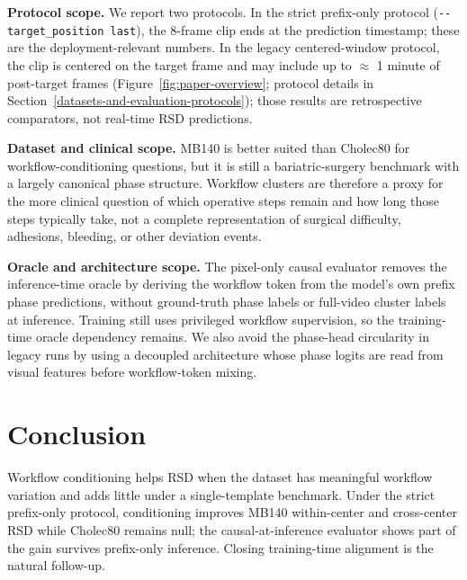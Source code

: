 \textbf{Protocol scope.} We report two protocols. In the strict
prefix-only protocol (\texttt{-\/-target\_position\ last}), the 8-frame
clip ends at the prediction timestamp; these are the deployment-relevant
numbers. In the legacy centered-window protocol, the clip is centered on
the target frame and may include up to $\approx$ 1 minute of post-target
frames (Figure~\ref{fig:paper-overview}; protocol details in
Section~\ref{datasets-and-evaluation-protocols}); those results are
retrospective comparators, not real-time RSD predictions.

\textbf{Dataset and clinical scope.} MB140 is better suited than
Cholec80 for workflow-conditioning questions, but it is still a
bariatric-surgery benchmark with a largely canonical phase structure.
Workflow clusters are therefore a proxy for the more clinical question
of which operative steps remain and how long those steps typically take,
not a complete representation of surgical difficulty, adhesions,
bleeding, or other deviation events.

\textbf{Oracle and architecture scope.} The pixel-only causal evaluator
removes the inference-time oracle by deriving the workflow token from the
model's own prefix phase predictions, without ground-truth phase labels
or full-video cluster labels at inference. Training still uses
privileged workflow supervision, so the training-time oracle dependency
remains. We also avoid the phase-head circularity in legacy runs by
using a decoupled architecture whose phase logits are read from visual
features before workflow-token mixing.

\section{Conclusion}\label{conclusion}

Workflow conditioning helps RSD when the dataset has meaningful workflow
variation and adds little under a single-template benchmark. Under the
strict prefix-only protocol, conditioning improves MB140 within-center
and cross-center RSD while Cholec80 remains null; the causal-at-inference
evaluator shows part of the gain survives prefix-only inference.
Closing training-time alignment is the natural follow-up.
